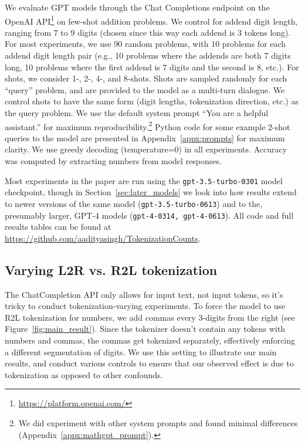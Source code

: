 \documentclass{article}
\theoremstyle{plain}
\theoremstyle{definition}
\theoremstyle{remark}
\begin{document}
We evaluate GPT models through the Chat Completions endpoint on the OpenAI API\footnote{\url{https://platform.openai.com/}} on few-shot addition problems. We control for addend digit length, ranging from 7 to 9 digits (chosen since this way each addend is 3 tokens long). For most experiments, we use 90 random problems, with 10 problems for each addend digit length pair (e.g., 10 problems where the addends are both 7 digits long, 10 problems where the first addend is 7 digits and the second is 8, etc.). For shots, we consider 1-, 2-, 4-, and 8-shots. Shots are sampled randomly for each ``query'' problem, and are provided to the model as a multi-turn dialogue. We control shots to have the same form (digit lengths, tokenization direction, etc.) as the query problem. We use the default system prompt ``You are a helpful assistant.'' for maximum reproducibility.\footnote{We did experiment with other system prompts and found minimal differences (Appendix~\ref{appx:mathgpt_prompt}).} Python code for some example 2-shot queries to the model are presented in Appendix~\ref{appx:prompts} for maximum clarity. We use greedy decoding (temperature=0) in all experiments. Accuracy was computed by extracting numbers from model responses.

Most experiments in the paper are run using the \texttt{gpt-3.5-turbo-0301} model checkpoint, though in Section~\ref{sec:later_models} we look into how results extend to newer versions of the same model (\texttt{gpt-3.5-turbo-0613}) and to the, presumably larger, GPT-4 models (\texttt{gpt-4-0314, gpt-4-0613}). All code and full results tables can be 
found at \url{https://github.com/aadityasingh/TokenizationCounts}.

\subsection{Varying L2R vs. R2L tokenization}
\label{sec:r2l_methods}

The ChatCompletion API only allows for input text, not input tokens, so it's tricky to conduct tokenization-varying experiments. To force the model to use R2L tokenization for numbers, we add commas every 3-digits from the right (see Figure~\ref{fig:main_result}). Since the tokenizer doesn't contain any tokens with numbers and commas, the commas get tokenized separately, effectively enforcing a different segmentation of digits. We use this setting to illustrate our main results, and conduct various controls to ensure that our observed effect is due to tokenization as opposed to other confounds.
\end{document}
